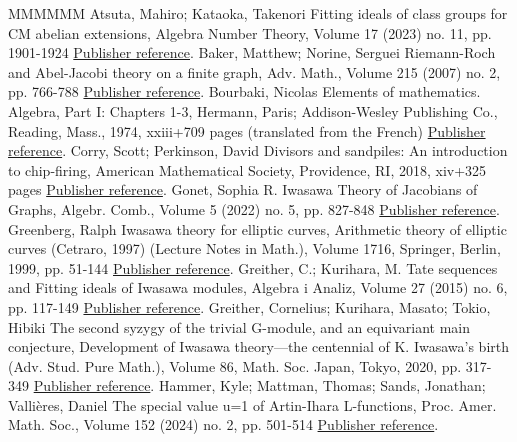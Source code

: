 \documentclass[11pt]{article}
\theoremstyle{definition}
\numberwithin{equation}{section}
\begin{document}
\begin{thebibliography}{MMMMMM}
 Atsuta, Mahiro; Kataoka, Takenori Fitting ideals of class groups for CM abelian extensions, Algebra Number Theory, Volume 17 (2023) no. 11, pp. 1901-1924 \href{https://alco.centre-mersenne.org/articles/10.5802/alco.355/#AK21}{Publisher reference}.
 Baker, Matthew; Norine, Serguei Riemann-Roch and Abel-Jacobi theory on a finite graph, Adv. Math., Volume 215 (2007) no. 2, pp. 766-788 \href{https://alco.centre-mersenne.org/articles/10.5802/alco.355/#BN07}{Publisher reference}.
 Bourbaki, Nicolas Elements of mathematics. Algebra, Part I: Chapters 1-3, Hermann, Paris; Addison-Wesley Publishing Co., Reading, Mass., 1974, xxiii+709 pages (translated from the French) \href{https://alco.centre-mersenne.org/articles/10.5802/alco.355/#BouAlg74}{Publisher reference}.
 Corry, Scott; Perkinson, David Divisors and sandpiles: An introduction to chip-firing, American Mathematical Society, Providence, RI, 2018, xiv+325 pages \href{https://alco.centre-mersenne.org/articles/10.5802/alco.355/#CP18}{Publisher reference}.
 Gonet, Sophia R. Iwasawa Theory of Jacobians of Graphs, Algebr. Comb., Volume 5 (2022) no. 5, pp. 827-848 \href{https://alco.centre-mersenne.org/articles/10.5802/alco.355/#Gon22}{Publisher reference}.
 Greenberg, Ralph Iwasawa theory for elliptic curves, Arithmetic theory of elliptic curves (Cetraro, 1997) (Lecture Notes in Math.), Volume 1716, Springer, Berlin, 1999, pp. 51-144 \href{https://alco.centre-mersenne.org/articles/10.5802/alco.355/#Gree99}{Publisher reference}.
 Greither, C.; Kurihara, M. Tate sequences and Fitting ideals of Iwasawa modules, Algebra i Analiz, Volume 27 (2015) no. 6, pp. 117-149 \href{https://alco.centre-mersenne.org/articles/10.5802/alco.355/#GK15}{Publisher reference}.
 Greither, Cornelius; Kurihara, Masato; Tokio, Hibiki The second syzygy of the trivial G-module, and an equivariant main conjecture, Development of Iwasawa theory—the centennial of K. Iwasawa’s birth (Adv. Stud. Pure Math.), Volume 86, Math. Soc. Japan, Tokyo, 2020, pp. 317-349 \href{https://alco.centre-mersenne.org/articles/10.5802/alco.355/#GKT20}{Publisher reference}.
 Hammer, Kyle; Mattman, Thomas; Sands, Jonathan; Vallières, Daniel The special value u=1 of Artin-Ihara L-functions, Proc. Amer. Math. Soc., Volume 152 (2024) no. 2, pp. 501-514 \href{https://alco.centre-mersenne.org/articles/10.5802/alco.355/#HMSV24}{Publisher reference}.

\end{thebibliography}
\end{document}

